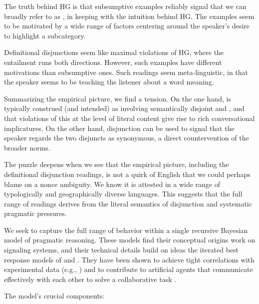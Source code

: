\documentclass{article}
\begin{document}
\begin{examples}
\item The truth behind HG is that subsumptive examples reliably signal
  that we can broadly refer to as , in keeping
  with the intuition behind HG.  The examples seem to be motivated by
  a wide range of factors centering around the speaker's desire to
  highlight a subcategory.

\item Definitional disjunctions seem like maximal violations of HG,
  where the entailment runs both directions. However, such examples
  have different motivations than subsumptive ones. Such readings seem
  meta-linguistic, in that the speaker seems to be teaching the
  listener about a word meaning.

\item Summarizing the empirical picture, we find a tension. On the one
  hand,  is typically construed (and intended) as
  involving semantically disjoint  and , and that
  violations of this at the level of literal content give rise to rich
  conversational implicatures. On the other hand, disjunction can be
  used to signal that the speaker regards the two disjuncts as
  synonymous, a direct countervention of the broader norms.

\item The puzzle deepens when we see that the empirical picture,
  including the definitional disjunction readings, is not a quirk of
  English that we could perhaps blame on a nonce ambiguity. We know it
  is attested in a wide range of typologically and geographically
  diverse languages. This suggests that the full range of readings
  derives from the literal semantics of disjunction and systematic
  pragmatic pressures.

\item We seek to capture the full range of behavior within a single
  recursive Bayesian model of pragmatic reasoning.  These models find
  their conceptual origins  work on signaling
  systems, and their technical details build on ideas the iterated
  best response models of \citet{Jaeger:2007} and
  \citet{Franke09DISS}. They have been shown to achieve tight
  correlations with experimental data (e.g.,
  \citealt{Frank:Goodman:2012}) and to contribute to artificial agents
  that communicate effectively with each other to solve a
  collaborative task \citep{Vogel-etal:2013}.

\item The model's crucial components:


\end{examples}
\end{document}
